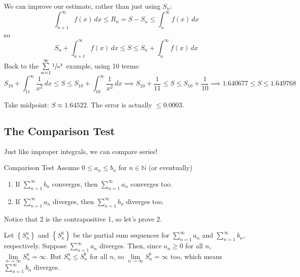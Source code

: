 We can improve our estimate, rather than just using $ S_n $:
\[ \int_{n+1}^{\infty} f(x)\, d{x} \leqslant R_n=S-S_n\leqslant \int_{n}^{\infty} f(x)\, d{x} \]
so
\[ S_n+\int_{n+1}^{\infty} f(x)\, d{x} \leqslant S\leqslant S_n+\int_{n}^{\infty} f(x)\, d{x} \]
Back to the $ \sum\limits_{n=1}^{\infty} \sfrac{1}{n^2} $ example, using 10 terms:
\[ S_{10}+\int_{11}^{\infty} \frac{1}{x^2} \, d{x} \leqslant S\leqslant S_{10}+\int_{10}^{\infty}
    \frac{1}{x^2} \, d{x}
    \implies S_{10}+\frac{1}{11} \leqslant S\leqslant S_{10}+\frac{1}{10} \implies
    1.640677\leqslant S\leqslant 1.649768  \]

Take midpoint: $ S\approx 1.64522 $. The error is actually $ \leqslant 0.0003 $.

\subsection{The Comparison Test}
Just like improper integrals, we can compare series!

\begin{Theorem}{Comparison Test}{}
    Assume $ 0\leqslant a_n\leqslant b_n $ for $ n\in\mathbb{N} $ (or eventually)
    \begin{enumerate}
        \item If $ \sum\limits_{n=1}^{\infty} b_n $ converges, then
              $ \sum\limits_{n=1}^{\infty} a_n $ converges too.
        \item If $ \sum\limits_{n=1}^{\infty} a_n $ diverges, then
              $ \sum\limits_{n=1}^{\infty} b_n $ diverges too.
    \end{enumerate}
\end{Theorem}
\begin{Proof}{}{}
    Notice that 2 is the contrapositive 1, so let's prove 2.

    Let $ \left\{ S_n^a\right\} $ and $ \left\{ S_n^b\right\} $ be the partial sum
    sequences for $ \sum\limits_{n=1}^{\infty} a_n $ and $ \sum\limits_{n=1}^{\infty} b_n $,
    respectively. Suppose $ \sum\limits_{n=1}^{\infty} a_n $ diverges. Then, since
    $ a_n\geqslant 0 $ for all $ n $, $ \lim\limits_{{n} \to {\infty}} S_n^a =\infty $.
    But $ S_n^a\leqslant S_n^b $ for all $ n $, so $ \lim\limits_{{n} \to {\infty}} S_n^b =\infty $
    too, which means $ \sum\limits_{n=1}^{\infty} b_n $ diverges.
\end{Proof}

